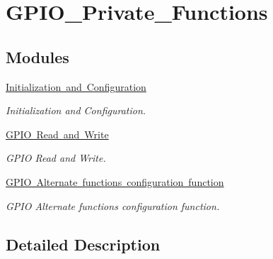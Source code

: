 \hypertarget{group___g_p_i_o___private___functions}{}\section{G\+P\+I\+O\+\_\+\+Private\+\_\+\+Functions}
\label{group___g_p_i_o___private___functions}
\subsection*{Modules}
\begin{DoxyCompactItemize}
\item 
\mbox{\hyperlink{group___g_p_i_o___group1}{Initialization and Configuration}}
\begin{DoxyCompactList}\small\item\em Initialization and Configuration. \end{DoxyCompactList}\item 
\mbox{\hyperlink{group___g_p_i_o___group2}{G\+P\+I\+O Read and Write}}
\begin{DoxyCompactList}\small\item\em G\+P\+IO Read and Write. \end{DoxyCompactList}\item 
\mbox{\hyperlink{group___g_p_i_o___group3}{G\+P\+I\+O Alternate functions configuration function}}
\begin{DoxyCompactList}\small\item\em G\+P\+IO Alternate functions configuration function. \end{DoxyCompactList}\end{DoxyCompactItemize}


\subsection{Detailed Description}
